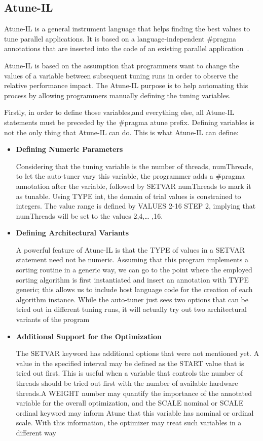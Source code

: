 \subsection{Atune-IL}

Atune-IL is a general instrument language that helps finding the best values to tune parallel applications. It is based on a language-independent \#pragma annotations that are inserted into the code of an existing parallel application~\cite{Schaefer2009}. 

Atune-IL is based on the assumption that programmers want to change the values of a variable between subsequent tuning runs in order to observe the relative performance impact. The Atune-IL purpose is to help automating this process by allowing programmers manually defining the tuning variables.

Firstly, in order to define those variables,and everything else, all Atune-IL statements must be preceded by the \#pragma atune prefix. Defining variables is not the only thing that Atune-IL can do. This is what Atune-IL can define:

\begin{itemize}
	\item \textbf{Defining Numeric Parameters}
	
Considering that the tuning variable is the number of threads, numThreads, to let the auto-tuner vary this variable, the programmer adds a \#pragma annotation after the variable, followed by SETVAR numThreads to mark it as tunable. Using TYPE int, the domain of trial values is constrained to integers. The value range is defined by VALUES 2-16 STEP 2, implying that numThreads will be set to the values 2,4,… ,16.
	
	\item \textbf{Defining Architectural Variants}

A powerful feature of Atune-IL is that the TYPE of values in a SETVAR statement need not be numeric. Assuming that this program implements a sorting routine in a generic way, we can go to the point where the employed sorting algorithm is first instantiated and insert an annotation with TYPE generic; this allows us to include host language code for the creation of each algorithm instance. While the auto-tuner just sees two options that can be tried out in different tuning runs,	it will actually try out two architectural variants of the program
	
	\item \textbf{Additional Support for the Optimization} 

The SETVAR keyword has additional options that were not mentioned yet. A value in the specified interval may be defined as the START value that is tried out first. This is useful when a variable that controls the number of threads should be tried out first with the number of available hardware threads.A WEIGHT number may quantify the importance of the annotated variable for the overall optimization, and the SCALE nominal or SCALE ordinal keyword may inform Atune that this variable has nominal or ordinal scale. With this information, the optimizer may treat such variables in a different way
	
\end{itemize}

